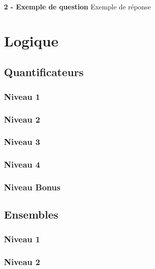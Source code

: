 \documentclass[a4paper]{report}
\begin{document}
		\vspace{7mm}
		
		\begin{tcolorbox}[colback=white,colframe=black]
			\textbf{2 - Exemple de question}
			\tcblower
			Exemple de réponse
		\end{tcolorbox}
		
	\chapter{Logique}
	
		\section{Quantificateurs}
		
			\subsection{Niveau 1}
		
			\subsection{Niveau 2}
		
			\subsection{Niveau 3}
			
			\subsection{Niveau 4}
			
			\subsection{Niveau Bonus}
		
		\section{Ensembles}
		
			\subsection{Niveau 1}
		
			\subsection{Niveau 2}
		
\end{document}
